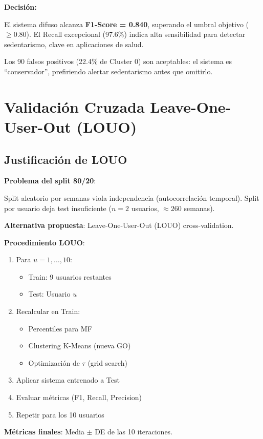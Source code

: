 \documentclass[12pt,letterpaper,twoside]{report}
\begin{document}
\begin{decisionbox}
\textbf{Decisión:}

El sistema difuso alcanza \textbf{F1-Score = 0.840}, superando el umbral objetivo ($\geq 0.80$). El Recall excepcional (97.6\%) indica alta sensibilidad para detectar sedentarismo, clave en aplicaciones de salud.

Los 90 falsos positivos (22.4\% de Cluster 0) son aceptables: el sistema es ``conservador'', prefiriendo alertar sedentarismo antes que omitirlo.
\end{decisionbox}

\section{Validación Cruzada Leave-One-User-Out (LOUO)}

\subsection{Justificación de LOUO}

\begin{hipotesisbox}
\textbf{Problema del split 80/20}:

Split aleatorio por semanas viola independencia (autocorrelación temporal). Split por usuario deja test insuficiente ($n=2$ usuarios, $\approx 260$ semanas).

\textbf{Alternativa propuesta}: Leave-One-User-Out (LOUO) cross-validation.
\end{hipotesisbox}

\begin{estadisticobox}
\textbf{Procedimiento LOUO}:

\begin{enumerate}[noitemsep]
    \item Para $u = 1, \ldots, 10$:
    \begin{itemize}[noitemsep]
        \item Train: 9 usuarios restantes
        \item Test: Usuario $u$
    \end{itemize}
    \item Recalcular en Train:
    \begin{itemize}[noitemsep]
        \item Percentiles para MF
        \item Clustering K-Means (nueva GO)
        \item Optimización de $\tau$ (grid search)
    \end{itemize}
    \item Aplicar sistema entrenado a Test
    \item Evaluar métricas (F1, Recall, Precision)
    \item Repetir para los 10 usuarios
\end{enumerate}

\textbf{Métricas finales}: Media $\pm$ DE de las 10 iteraciones.
\end{estadisticobox}
\end{document}
